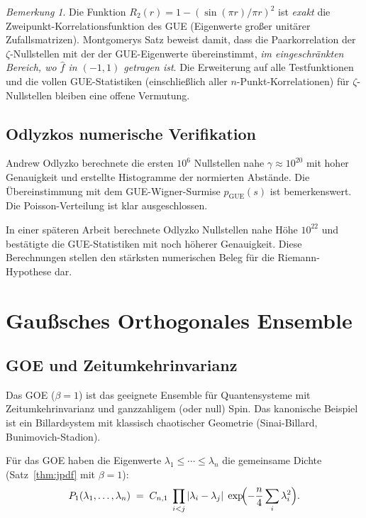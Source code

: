 \documentclass[12pt,a4paper]{amsart}
\theoremstyle{definition}
\theoremstyle{remark}
\newtheorem{bemerkung}[theorem]{Bemerkung}
\begin{document}
\begin{bemerkung}
Die Funktion $R_2(r) = 1 - (\sin(\pi r)/\pi r)^2$ ist \emph{exakt} die
Zweipunkt-Korrelationsfunktion des GUE (Eigenwerte großer unitärer Zufallsmatrizen).
Montgomerys Satz beweist damit, dass die Paarkorrelation der $\zeta$-Nullstellen
mit der der GUE-Eigenwerte übereinstimmt,
\emph{im eingeschränkten Bereich, wo $\hat{f}$ in $(-1,1)$ getragen ist}.
Die Erweiterung auf alle Testfunktionen und die vollen GUE-Statistiken
(einschließlich aller $n$-Punkt-Korrelationen) für $\zeta$-Nullstellen bleiben
eine offene Vermutung.
\end{bemerkung}

\subsection{Odlyzkos numerische Verifikation}

Andrew Odlyzko \cite{Odlyzko1987} berechnete die ersten $10^6$ Nullstellen
nahe $\gamma \approx 10^{20}$ mit hoher Genauigkeit und erstellte Histogramme
der normierten Abstände. Die Übereinstimmung mit dem GUE-Wigner-Surmise
$p_{\mathrm{GUE}}(s)$ ist bemerkenswert. Die Poisson-Verteilung ist klar
ausgeschlossen.

In einer späteren Arbeit \cite{Odlyzko2001} berechnete Odlyzko Nullstellen nahe Höhe $10^{22}$
und bestätigte die GUE-Statistiken mit noch höherer Genauigkeit.
Diese Berechnungen stellen den stärksten numerischen Beleg für die Riemann-Hypothese dar.

\section{Gaußsches Orthogonales Ensemble}
\label{sec:goe}

\subsection{GOE und Zeitumkehrinvarianz}

Das GOE ($\beta = 1$) ist das geeignete Ensemble für Quantensysteme mit
Zeitumkehrinvarianz und ganzzahligem (oder null) Spin. Das kanonische
Beispiel ist ein Billardsystem mit klassisch chaotischer Geometrie
(Sinai-Billard, Bunimovich-Stadion).

Für das GOE haben die Eigenwerte $\lambda_1 \leq \cdots \leq \lambda_n$
die gemeinsame Dichte (Satz~\ref{thm:jpdf} mit $\beta = 1$):
\[
  P_1(\lambda_1,\ldots,\lambda_n)
  \;=\; C_{n,1}\;\prod_{i<j}|\lambda_i - \lambda_j|\;\exp\!\Bigl(-\frac{n}{4}\sum_i \lambda_i^2\Bigr).
\]
\end{document}
